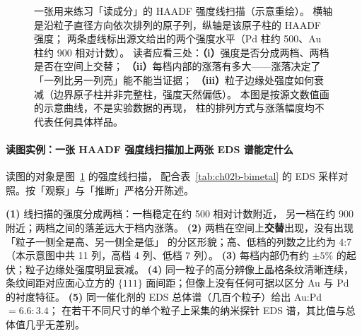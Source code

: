 \begin{figure}[htbp]
\centering
{}
\caption{一张用来练习「读成分」的 HAADF 强度线扫描（示意重绘）。
横轴是沿粒子直径方向依次排列的原子列，纵轴是该原子柱的 HAADF 强度；
两条虚线标出源文给出的两个强度水平（Pd 柱约 500、Au 柱约 900 相对计数）。
读者应看三处：\textbf{（i）}强度是否分成两档、两档是否在空间上交替；
\textbf{（ii）}每档内部的涨落有多大——涨落决定了「一列比另一列亮」能不能当证据；
\textbf{（iii）}粒子边缘处强度如何衰减（边界原子柱并非完整柱，强度天然偏低）。
本图是按源文数值画的示意曲线，不是实验数据的再现，
柱的排列方式与涨落幅度均不代表任何具体样品。\schemamark\redrawmark
{}}
\label{fig:ch02b-haadf-profile}
\end{figure}

\paragraph{读图实例：一张 HAADF 强度线扫描加上两张 EDS 谱能定什么}
读图的对象是图~\ref{fig:ch02b-haadf-profile} 的强度线扫描，
配合表~\ref{tab:ch02b-bimetal} 的 EDS 采样对照。按「观察」与「推断」严格分开陈述。

\begin{obs}
\textbf{(1)} 线扫描的强度分成两档：一档稳定在约 500 相对计数附近，
另一档在约 900 附近；两档之间的落差远大于档内涨落。
\textbf{(2)} 两档在空间上\textbf{交替}出现，没有出现「粒子一侧全是高、另一侧全是低」
的分区形貌；高、低档的列数之比约为 4:7
（本示意图中共 11 列，高档 4 列、低档 7 列）。
\textbf{(3)} 每档内部仍有约 $\pm5\%$ 的起伏；粒子边缘处强度明显衰减。
\textbf{(4)} 同一粒子的高分辨像上晶格条纹清晰连续，条纹间距对应面心立方的
$\{111\}$ 面间距；但像上没有任何可据以区分 Au 与 Pd 的衬度特征。
\textbf{(5)} 同一催化剂的 EDS 总体谱（几百个粒子）给出 Au:Pd $=6.6:3.4$；
在若干不同尺寸的单个粒子上采集的纳米探针 EDS 谱，其比值与总体值几乎无差别。
\end{obs}

